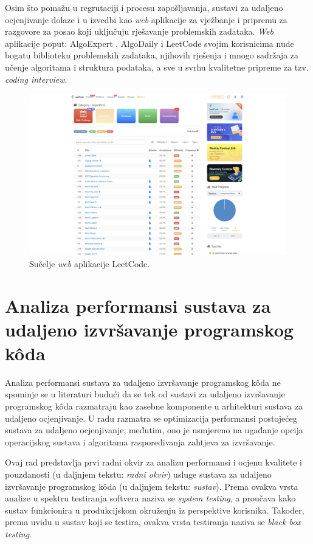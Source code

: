 \documentclass[times, utf8, diplomski]{fer}
\begin{document}
Osim što pomažu u regrutaciji i procesu zapošljavanja, sustavi za udaljeno ocjenjivanje dolaze i u izvedbi kao \textit{web} aplikacije za vježbanje i pripremu za razgovore za posao koji uključuju rješavanje problemskih zadataka. \textit{Web} aplikacije poput: AlgoExpert \citep{AlgoExpert}, AlgoDaily \citep{AlgoDaily} i LeetCode \citep{LeetCode} svojim korisnicima nude bogatu biblioteku problemskih zadataka, njihovih rješenja i mnogo sadržaja za učenje algoritama i struktura podataka, a sve u svrhu kvalitetne pripreme za tzv. \textit{coding interview}.

\begin{figure}[htb]
	\centering
	\includegraphics[width=\textwidth]{images/LeetCode UI.png}
	\caption{
		Sučelje \textit{web} aplikacije LeetCode.
	}
	\label{fig:leetcode-ui}
\end{figure}

\chapter{Analiza performansi sustava za udaljeno izvršavanje programskog kôda}
\label{chap:analysis}
Analiza performansi sustava za udaljeno izvršavanje programskog kôda ne spominje se u literaturi budući da se tek od \citep{9245310} sustavi za udaljeno izvršavanje programskog kôda razmatraju kao zasebne komponente u arhitekturi sustava za udaljeno ocjenjivanje. U radu \citep{drung2011enhance} razmatra se optimizacija performansi postojećeg sustava za udaljeno ocjenjivanje, međutim, ono je usmjereno na ugađanje opcija operacijskog sustava i algoritama raspoređivanja zahtjeva za izvršavanje.

Ovaj rad predstavlja prvi radni okvir za analizu performansi i ocjenu kvalitete i pouzdanosti (u daljnjem tekstu: \textit{radni okvir}) usluge sustava za udaljeno izvršavanje programskog kôda (u daljnjem tekstu: \textit{sustav}). Prema \citep{nidhra2012black} ovakva vrsta analize u spektru testiranja softvera naziva se \textit{system testing}, a proučava kako sustav funkcionira u produkcijskom okruženju iz perspektive korisnika. Također, prema uvidu u sustav koji se testira, ovakva vrsta testiranja naziva se \textit{black box testing}.
\end{document}
